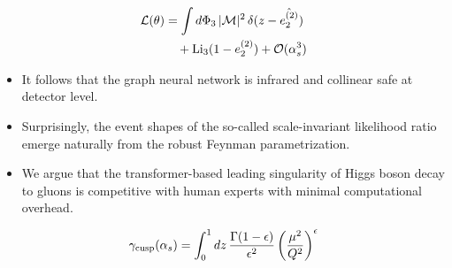 \begin{align}
  \mathcal{L}(\theta) &= \int d\Phi_{3} \, |\mathcal{M}|^2 \, \delta(z - \hat{e_2^{(2)}}) \nonumber \\
  &\quad + \mathrm{Li}_{3}(1 - e_2^{(2)}) + \mathcal{O}(\alpha_s^3) \label{eq:6}
\end{align}

\begin{itemize}
  \item It follows that the graph neural network is infrared and collinear safe at detector level.
  \item Surprisingly, the event shapes of the so-called scale-invariant likelihood ratio emerge naturally from the robust Feynman parametrization.
  \item We argue that the transformer-based leading singularity of Higgs boson decay to gluons is competitive with human experts with minimal computational overhead.
\end{itemize}

\begin{equation}
  \gamma_{\rm cusp}(\alpha_s) = \int_0^1 dz \, \frac{\Gamma(1-\epsilon)}{\epsilon^{2}} \left(\frac{\mu^2}{Q^2}\right)^{\epsilon}
  \label{eq:7}
\end{equation}

